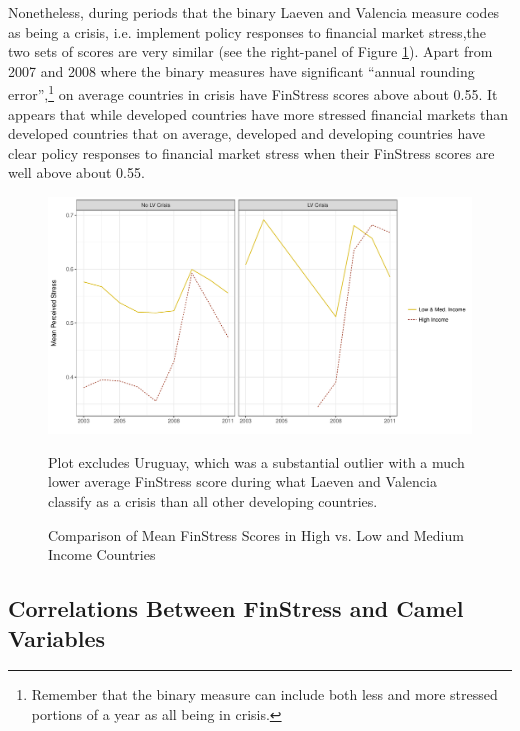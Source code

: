 \documentclass[]{article}
\begin{document}
Nonetheless, during periods that the binary Laeven and Valencia measure codes as being a crisis, i.e. implement policy responses to financial market stress,the two sets of scores are very similar (see the right-panel of Figure \ref{comp_dev_developing}). Apart from 2007 and 2008 where the binary measures have significant ``annual rounding error'',\footnote{Remember that the binary measure can include both less and more stressed portions of a year as all being in crisis.} on average countries in crisis have FinStress scores above about 0.55. It appears that while developed countries have more stressed financial markets than developed countries that on average, developed and developing countries have clear policy responses to financial market stress when their FinStress scores are well above about 0.55.

\begin{figure}
    \caption{Comparison of Mean FinStress Scores in High vs. Low and Medium Income Countries}
    \label{comp_dev_developing}

    \begin{center}
        \includegraphics[scale=0.55]{figures/dev_vs_developing.pdf}
    \end{center}
    {\scriptsize{Plot excludes Uruguay, which was a substantial outlier with a much lower average FinStress score during what Laeven and Valencia classify as a crisis than all other developing countries.}}
\end{figure}

\subsection*{Correlations Between FinStress and Camel Variables}
\end{document}
